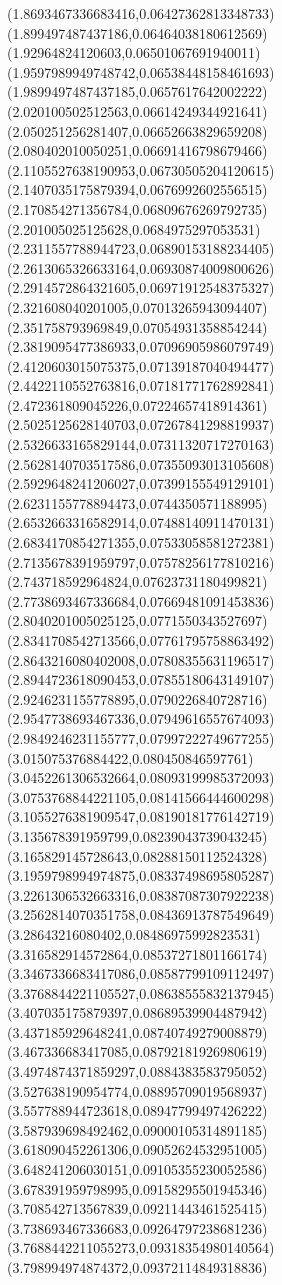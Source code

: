 {(1.8693467336683416,0.06427362813348733)
(1.899497487437186,0.06464038180612569)
(1.92964824120603,0.06501067691940011)
(1.9597989949748742,0.06538448158461693)
(1.9899497487437185,0.0657617642002222)
(2.020100502512563,0.06614249344921641)
(2.050251256281407,0.06652663829659208)
(2.080402010050251,0.06691416798679466)
(2.1105527638190953,0.06730505204120615)
(2.1407035175879394,0.0676992602556515)
(2.170854271356784,0.06809676269792735)
(2.201005025125628,0.0684975297053531)
(2.2311557788944723,0.06890153188234405)
(2.2613065326633164,0.06930874009800626)
(2.2914572864321605,0.06971912548375327)
(2.321608040201005,0.07013265943094407)
(2.351758793969849,0.07054931358854244)
(2.3819095477386933,0.07096905986079749)
(2.4120603015075375,0.07139187040494477)
(2.4422110552763816,0.07181771762892841)
(2.472361809045226,0.07224657418914361)
(2.5025125628140703,0.07267841298819937)
(2.5326633165829144,0.07311320717270163)
(2.5628140703517586,0.07355093013105608)
(2.5929648241206027,0.07399155549129101)
(2.6231155778894473,0.0744350571188995)
(2.6532663316582914,0.07488140911470131)
(2.6834170854271355,0.07533058581272381)
(2.7135678391959797,0.07578256177810216)
(2.743718592964824,0.07623731180499821)
(2.7738693467336684,0.07669481091453836)
(2.8040201005025125,0.0771550343527697)
(2.8341708542713566,0.07761795758863492)
(2.8643216080402008,0.07808355631196517)
(2.8944723618090453,0.07855180643149107)
(2.9246231155778895,0.0790226840728716)
(2.9547738693467336,0.07949616557674093)
(2.9849246231155777,0.07997222749677255)
(3.015075376884422,0.080450846597761)
(3.0452261306532664,0.08093199985372093)
(3.0753768844221105,0.08141566444600298)
(3.1055276381909547,0.08190181776142719)
(3.135678391959799,0.08239043739043245)
(3.165829145728643,0.08288150112524328)
(3.1959798994974875,0.08337498695805287)
(3.2261306532663316,0.08387087307922238)
(3.2562814070351758,0.08436913787549649)
(3.28643216080402,0.08486975992823531)
(3.316582914572864,0.08537271801166174)
(3.3467336683417086,0.08587799109112497)
(3.3768844221105527,0.08638555832137945)
(3.407035175879397,0.08689539904487942)
(3.437185929648241,0.08740749279008879)
(3.467336683417085,0.08792181926980619)
(3.4974874371859297,0.0884383583795052)
(3.527638190954774,0.08895709019568937)
(3.557788944723618,0.08947799497426222)
(3.587939698492462,0.09000105314891185)
(3.618090452261306,0.09052624532951005)
(3.648241206030151,0.09105355230052586)
(3.678391959798995,0.09158295501945346)
(3.708542713567839,0.09211443461525415)
(3.738693467336683,0.09264797238681236)
(3.7688442211055273,0.09318354980140564)
(3.798994974874372,0.09372114849318836)
}
